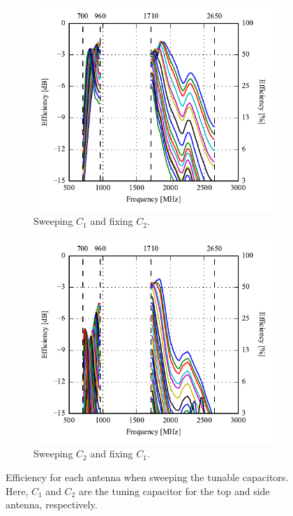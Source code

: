 \begin{figure}[htbp]
    \centering
    \begin{subfigure}{0.49\linewidth}
        \includegraphics{img/tech_sol/monopole/5mm/meas/efficiency_top}
        \caption{Sweeping $C_1$ and fixing $C_2$.}
    \end{subfigure}
    \hfill
    \begin{subfigure}{0.49\linewidth}
        \includegraphics{img/tech_sol/monopole/5mm/meas/efficiency_side}
        \caption{Sweeping $C_2$ and fixing $C_1$.}
    \end{subfigure}
    \caption{Efficiency for each antenna when sweeping the tunable capacitors. Here, $C_1$ and $C_2$ are the tuning capacitor for the top and side antenna, respectively.}
    \label{fig:eff_mono_mini_meas}
\end{figure}


